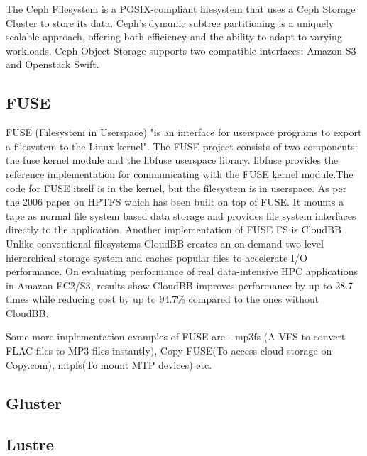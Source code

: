      The Ceph Filesystem \cite{www-cephfs} is a POSIX-compliant
     filesystem that uses a Ceph Storage Cluster to store its
     data. Ceph’s dynamic subtree partitioning is a uniquely scalable
     approach, offering both efficiency and the ability to adapt to
     varying workloads. Ceph Object Storage supports two compatible
     interfaces: Amazon S3 and Openstack Swift.

\subsection{FUSE}

     FUSE (Filesystem in Userspace) \cite{www-fuse} "is an interface
     for userspace programs to export a filesystem to the Linux
     kernel". The FUSE project consists of two components: the fuse
     kernel module and the libfuse userspace library. libfuse provides
     the reference implementation for communicating with the FUSE
     kernel module.The code for FUSE itself is in the kernel, but the
     filesystem is in userspace.  As per the 2006 paper
     \cite{fuse-paper-hptfs} on HPTFS which has been built on top of
     FUSE. It mounts a tape as normal file system based data storage
     and provides file system interfaces directly to the application.
     Another implementation of FUSE FS is CloudBB
     \cite{fuse-paper-CloudBB}. Unlike conventional filesystems
     CloudBB creates an on-demand two-level hierarchical storage
     system and caches popular files to accelerate I/O performance. On
     evaluating performance of real data-intensive HPC applications in
     Amazon EC2/S3, results show CloudBB improves performance by up to
     28.7 times while reducing cost by up to 94.7\% compared to the
     ones without CloudBB.

     Some more implementation examples of FUSE are - mp3fs (A VFS to
     convert FLAC files to MP3 files instantly), Copy-FUSE(To access
     cloud storage on Copy.com), mtpfs(To mount MTP devices) etc.

\subsection{Gluster}
\subsection{Lustre}

